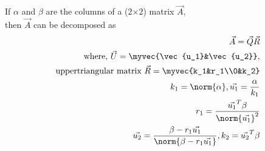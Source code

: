 
%
If $\alpha$ and $\beta$ are the columns of a (2$\times$2) matrix $\vec{A}$,\\
then $\vec{A}$ can be decomposed as 
\begin{align}
  \vec{A}=\vec{Q}\vec{R}\label{eq:solutions/2/18/1}\\
  \text{where, } \vec{U}=\myvec{\vec{u_1}&\vec{u_2}},\\
  \text{uppertriangular matrix }\vec{R}=\myvec{k_1&r_1\\0&k_2}\\
  k_1=\norm{\alpha},\vec{u_1}=\frac{\alpha}{k_1}\label{eq:solutions/2/18/2}\\
 r_1=\frac{\vec{u_1}^T\beta}{\norm{\vec{u_1}}^2}\label{eq:solutions/2/18/3} \\
 \vec{u_2}=\frac{\beta-r_1\vec{u_1}}{\norm{\beta-r_1\vec{u_1}}},k_2=\vec{u_2}^T\beta\label{eq:solutions/2/18/4}
\end{align}

